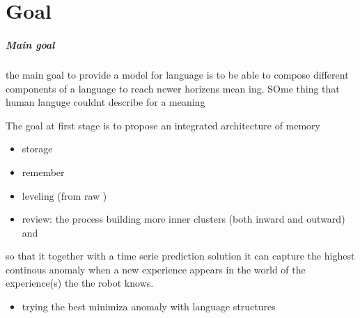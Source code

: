 \chapter{Goal}
    


\paragraph{Main goal}
    the main goal to provide a model for language is to be able to compose different components of a language to reach newer horizens mean ing. SOme thing that human languge couldnt describe for a meaning

The goal at first stage is to propose an integrated architecture of memory
\begin{itemize}
    \item storage
    \item remember
    \item leveling (from raw )
    \item review: the process building more inner clusters (both inward and outward) and
\end{itemize}
so that it together with a time serie prediction solution it can capture the highest continous anomaly when a new experience appears in the world of the experience(s) the the robot knows.
        
        
        \begin{itemize}
            \item trying the best minimiza anomaly with language structures
        \end{itemize}